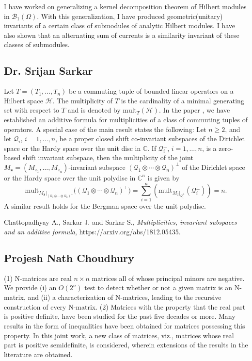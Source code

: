 I have worked on generalizing a kernel decomposition theorem of Hilbert modules in $\mathcal{B}_1(\Omega)$. With this generalization, I have produced geometric(unitary) invariants of a certain class of submodules of analytic Hilbert modules. I have also shown that an alternating sum of currents is a similarity invariant of these classes of submodules. 


\subsection{Dr. Srijan Sarkar}

  Let $T = (T_1, \ldots, T_n)$ be a commuting tuple of bounded linear operators on a Hilbert space $\mathcal{H}$. The multiplicity of $T$ is the cardinality of a minimal generating set with respect to $T$ and is denoted by $\mbox{mult}_{T}(\mathcal{H})$. In the paper \cite{CSS}, we have established an additive formula for multiplicities of a class of commuting tuples of operators. A special case of the main result states the following: Let $n \geq 2$, and let $\mathcal{Q}_i$, $i = 1, \ldots, n$, be a proper closed shift co-invariant subspaces of the Dirichlet space or the Hardy space over the unit disc in $\mathbb{C}$. If $\mathcal{Q}_i^{\perp}$, $i = 1, \ldots, n$, is a zero-based shift invariant subspace, then the multiplicity of the joint $M_{\bm z} = (M_{z_1}, \ldots, M_{z_n})$-invariant subspace $(\mathcal{Q}_1 \otimes \cdots \otimes \mathcal{Q}_n)^{\perp}$ of the Dirichlet space or the Hardy space over the unit polydisc in $\mathbb{C}^n$ is given by \[ \mbox{mult}_{M_{\bm z}|_{ (\mathcal{Q}_1 \otimes \cdots \otimes \mathcal{Q}_n)^\perp}} \big((\mathcal{Q}_1 \otimes \cdots \otimes \mathcal{Q}_n)^\perp \big) = \sum_{i=1}^n (\mbox{mult}_{M_z|_{\mathcal{Q}_i^{\perp}}} (\mathcal{Q}_i^{\perp})) = n. \] A similar result holds for the Bergman space over the unit polydisc.  \begin{thebibliography}{99}   Chattopadhyay A., Sarkar J. and Sarkar S., {\em Multiplicities, invariant subspaces and an additive formula}, https://arxiv.org/abs/1812.05435.  \end{thebibliography}   


\subsection{Projesh Nath Choudhury}

(1)  N-matrices are real $n\times n$ matrices all of whose principal  minors are negative. We provide (i) an $O(2^n)$ test to detect whether or not a given matrix is an N-matrix, and (ii) a characterization of N-matrices, leading to the recursive construction of every N-matrix.  (2) Matrices with the property that the real part is positive definite, have been studied for the past five decades or more. Many results in the form of inequalities have been obtained for matrices possessing this property. In this joint work, a new class of matrices, viz., matrices whose real part is positive semidefinite, is considered, wherein extensions of the results in the literature are obtained.


